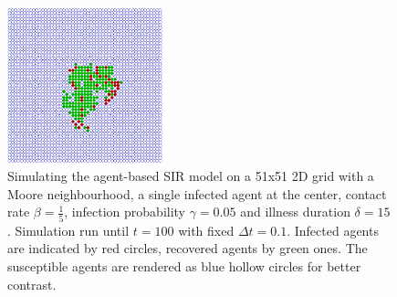 %    	
%  
%	

\begin{figure}
	\centering
	\includegraphics[width=0.4\textwidth, angle=0]{./fig/sir/vis/51x51agents_t100_01dt.png}
	\caption{Simulating the agent-based SIR model on a 51x51 2D grid with a Moore neighbourhood, a single infected agent at the center, contact rate $\beta = \frac{1}{5}$, infection probability $\gamma = 0.05$ and illness duration $\delta = 15$ . Simulation run until $t = 100$ with fixed $\Delta t = 0.1$. Infected agents are indicated by red circles, recovered agents by green ones. The susceptible agents are rendered as blue hollow circles for better contrast.}
	\label{fig:vis_sir}
\end{figure}


